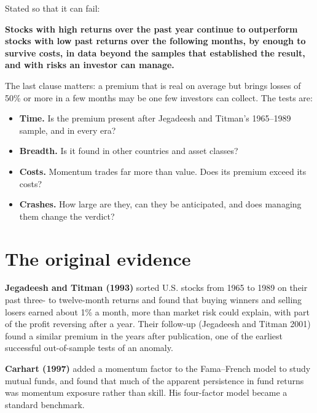 Stated so that it can fail:

\begin{callout}
\textbf{Stocks with high returns over the past year continue to outperform stocks with low past returns over the following months, by enough to survive costs, in data beyond the samples that established the result, and with risks an investor can manage.}
\end{callout}

The last clause matters: a premium that is real on average but brings losses of 50\% or more in a few months may be one few investors can collect. The tests are:

\begin{itemize}
  \item \textbf{Time.} Is the premium present after Jegadeesh and Titman's 1965--1989 sample, and in every era?
  \item \textbf{Breadth.} Is it found in other countries and asset classes?
  \item \textbf{Costs.} Momentum trades far more than value. Does its premium exceed its costs?
  \item \textbf{Crashes.} How large are they, can they be anticipated, and does managing them change the verdict?
\end{itemize}

\section{The original evidence}
\label{sec:05-evidence}

\textbf{Jegadeesh and Titman (1993)} sorted U.S. stocks from 1965 to 1989 on their past three- to twelve-month returns and found that buying winners and selling losers earned about 1\% a month, more than market risk could explain, with part of the profit reversing after a year. Their follow-up (Jegadeesh and Titman 2001) found a similar premium in the years after publication, one of the earliest successful out-of-sample tests of an anomaly.

\textbf{Carhart (1997)} added a momentum factor to the Fama--French model to study mutual funds, and found that much of the apparent persistence in fund returns was momentum exposure rather than skill. His four-factor model became a standard benchmark.

